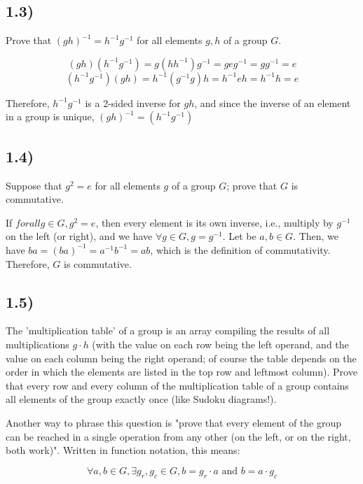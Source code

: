 \documentclass[12pt, letterpaper, twoside]{report}
\begin{document}
\subsection*{1.3)}

Prove that $(gh)^{-1} = h^{-1} g^{-1}$ for all elements $g, h$ of a group $G$.

$$(gh)(h^{-1}g^{-1}) = g(hh^{-1})g^{-1} = geg^{-1} = gg^{-1} = e$$
$$(h^{-1}g^{-1})(gh) = h^{-1}(g^{-1}g)h = h^{-1}eh = h^{-1}h = e$$

Therefore, $h^{-1} g^{-1}$ is a 2-sided inverse for $gh$, and since the inverse of an element in a group is unique, $(gh)^{-1} = (h^{-1}g^{-1})$



\subsection*{1.4)}

Suppose that $g^2 = e$ for all elements $g$ of a group $G$; prove that $G$ is commutative.

If $forall g \in G, g^2 = e$, then every element is its own inverse, i.e., multiply by $g^{-1}$ on the left (or right), and we have $\forall g \in G, g = g^{-1}$. Let be $a, b \in G$. Then, we have $ba = (ba)^{-1} = a^{-1}b^{-1} = ab$, which is the definition of commutativity. Therefore, $G$ is commutative.



\subsection*{1.5)}

The 'multiplication table' of a group is an array compiling the results of all multiplications $g \cdot h$ (with the value on each row being the left operand, and the value on each column being the right operand; of course the table depends on the order in which the elements are listed in the top row and leftmost column). Prove that every row and every column of the multiplication table of a group contains all elements of the group exactly once (like Sudoku diagrams!).

Another way to phrase this question is "prove that every element of the group can be reached in a single operation from any other (on the left, or on the right, both work)". Written in function notation, this means:

$$\forall a, b \in G, \exists g_r, g_c \in G, b = g_r \cdot a \text { and } b = a \cdot g_c$$
\end{document}
